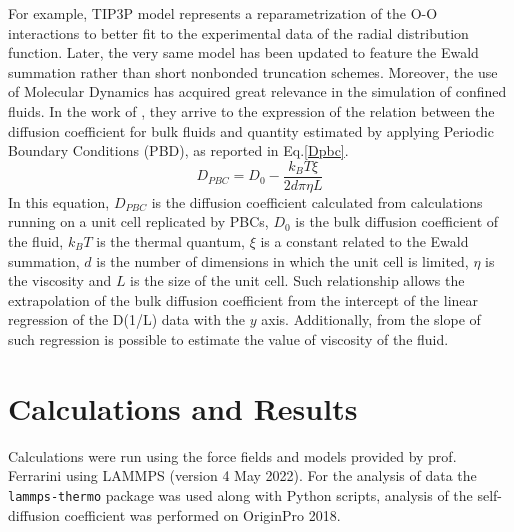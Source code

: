 \documentclass[
	12pt, %
]{fphw}
\begin{document}
For example, TIP3P\cite{jorgensen_comparison_1983} model represents a reparametrization of the O-O interactions to better fit to the experimental data of the radial distribution function.
Later, the very same model has been updated to feature the Ewald summation rather than short nonbonded truncation schemes.\cite{price_modified_2004}
Moreover, the use of Molecular Dynamics has acquired great relevance in the simulation of confined fluids.
In the work of \citet{yeh_system-size_2004}, they arrive to the expression of the relation between the diffusion coefficient for bulk fluids and quantity estimated by applying Periodic Boundary Conditions (PBD), as reported in Eq.\ref{Dpbc}.
\begin{equation}
	D_{PBC} = D_{0} - \frac{k_{B}T\xi}{2d \pi \eta L}
	\label{Dpbc}
\end{equation}
In this equation, $D_{PBC}$ is the diffusion coefficient calculated from calculations running on a unit cell replicated by PBCs, $D_{0}$ is the bulk diffusion coefficient of the fluid, $k_{B}T$ is the thermal quantum, $\xi$ is a constant related to the Ewald summation, $d$ is the number of dimensions in which the unit cell is limited, $\eta$ is the viscosity and $L$ is the size of the unit cell.
Such relationship allows the extrapolation of the bulk diffusion coefficient from the intercept of the linear regression of the D(1/L) data with the $y$ axis.
Additionally, from the slope of such regression is possible to estimate the value of viscosity of the fluid.

\section{Calculations and Results}
Calculations were run using the force fields and models provided by prof. Ferrarini using LAMMPS (version 4 May 2022).\cite{thompson_lammps_2022}
For the analysis of data the \texttt{lammps-thermo}\cite{ryan_s_defever_lammps_thermo_2021} package was used along with Python scripts\cite{matteo_finco_md_water_self_diffusion_2022}, analysis of the self-diffusion coefficient was performed on OriginPro 2018.
\end{document}
